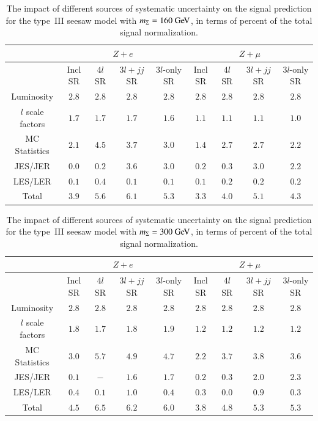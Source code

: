 \begin{table}[htbp]
  \centering
  \begin{tabular}{|c|c|c|c|c||c|c|c|c|}
    \hline
     & \multicolumn{4}{|c||}{$Z+e$} & \multicolumn{4}{c|}{$Z+\mu$} \\
    \hline
     &  Incl SR & $4l$ SR & $3l+jj$ SR  & $3l$-only SR  & Incl SR & $4l$ SR & $3l+jj$ SR  & $3l$-only SR  \\
    \hline
    Luminosity  & $2.8$ & $2.8$ & $2.8$ & $2.8$ & $2.8$ & $2.8$ & $2.8$ & $2.8$ \\
    $l$ scale factors & $1.7$ & $1.7$ & $1.7$ & $1.6$ & $1.1$ & $1.1$ & $1.1$ & $1.0$ \\
    MC Statistics & $2.1$ & $4.5$ & $3.7$ & $3.0$ & $1.4$ & $2.7$ & $2.7$ & $2.2$ \\
    JES/JER & $0.0$ & $0.2$ & $3.6$ & $3.0$ & $0.2$ & $0.3$ & $3.0$ & $2.2$ \\
    LES/LER & $0.1$ & $0.4$ & $0.1$ & $0.1$ & $0.1$ & $0.2$ & $0.2$ & $0.2$ \\
    \hline
    \hline
    Total & $3.9$ & $5.6$ & $6.1$ & $5.3$ & $3.3$ & $4.0$ & $5.1$ & $4.3$ \\
    \hline
  \end{tabular}
  \caption{The impact of different sources of systematic uncertainty on the signal prediction for the type~III seesaw model with $m_{\Sigma}=160 \GeV$, in terms of percent of the total signal normalization.}
  \label{table:systematics-impact-summary-seesaw-160}
\end{table}

\begin{table}[htbp]
  \centering
  \begin{tabular}{|c|c|c|c|c||c|c|c|c|}
    \hline
     & \multicolumn{4}{|c||}{$Z+e$} & \multicolumn{4}{c|}{$Z+\mu$} \\
    \hline
     &  Incl SR & $4l$ SR & $3l+jj$ SR  & $3l$-only SR  & Incl SR & $4l$ SR & $3l+jj$ SR  & $3l$-only SR  \\
    \hline
    Luminosity  & $2.8$ & $2.8$ & $2.8$ & $2.8$ & $2.8$ & $2.8$ & $2.8$ & $2.8$ \\
    $l$ scale factors & $1.8$ & $1.7$ & $1.8$ & $1.9$ & $1.2$ & $1.2$ & $1.2$ & $1.2$ \\
    MC Statistics & $3.0$ & $5.7$ & $4.9$ & $4.7$ & $2.2$ & $3.7$ & $3.8$ & $3.6$ \\
    JES/JER & $0.1$ & $-$ & $1.6$ & $1.7$ & $0.2$ & $0.3$ & $2.0$ & $2.3$ \\
    LES/LER & $0.4$ & $0.1$ & $1.0$ & $0.4$ & $0.3$ & $0.0$ & $0.9$ & $0.3$ \\
    \hline
    \hline
    Total & $4.5$ & $6.5$ & $6.2$ & $6.0$ & $3.8$ & $4.8$ & $5.3$ & $5.3$ \\
    \hline
  \end{tabular}
  \caption{The impact of different sources of systematic uncertainty on the signal prediction for the type~III seesaw model with $m_{\Sigma}=300 \GeV$, in terms of percent of the total signal normalization.}
  \label{table:systematics-impact-summary-seesaw-300}
\end{table}

